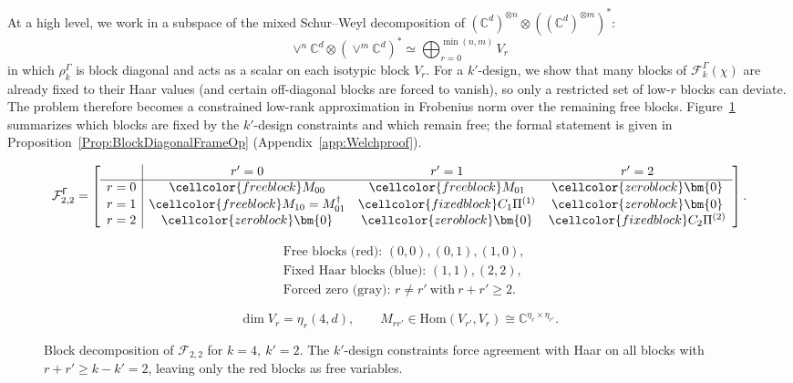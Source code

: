 \documentclass[aps,twocolumn,pra,superscriptaddress,nofootinbib]{revtex4-2}
\begin{document}
At a high level, we work in a subspace of the mixed Schur--Weyl decomposition of $(\mathbb{C}^d)^{\otimes n} \otimes ((\mathbb{C}^d)^{\otimes m})^*$:
\begin{equation}
    \vee^n \mathbb{C}^d \otimes (\vee^m \mathbb{C}^d)^* 
    \simeq \bigoplus_{r=0}^{\min(n,m)} V_r
\end{equation}
in which $\rho_k^{\mathsf{\Gamma}}$ is block diagonal and acts as a scalar on each isotypic block $V_r$.
For a $k'$-design, we show that many blocks of $\mathcal F_k^{\mathsf{\Gamma}}(\chi)$ are already fixed to their Haar values (and certain off-diagonal blocks are forced to vanish), so only a restricted set of low-$r$ blocks can deviate.
The problem therefore becomes a constrained low-rank approximation in Frobenius norm over the remaining free blocks. Figure~\ref{fig:block-k4-kp2} summarizes which blocks are fixed by the $k'$-design constraints and which remain free; the formal statement is given in Proposition~\ref{Prop:BlockDiagonalFrameOp} (Appendix~\ref{app:Welchproof}).
\begin{figure}[h!]
\centering
\renewcommand{\arraystretch}{1.35}



\[
\mathcal F_{2,2}^\mathsf{\Gamma}
=
\left[
\begin{array}{c|ccc}
 & r'=0 & r'=1 & r'=2\\
\hline
r=0 &
\cellcolor{freeblock} M_{00} &
\cellcolor{freeblock} M_{01} &
\cellcolor{zeroblock} \bm{0}
\\
r=1 &
\cellcolor{freeblock} M_{10}=M_{01}^{\dagger} &
\cellcolor{fixedblock} C_{1}\Pi^{(1)} &
\cellcolor{zeroblock} \bm{0}
\\
r=2 &
\cellcolor{zeroblock} \bm{0} &
\cellcolor{zeroblock} \bm{0} &
\cellcolor{fixedblock} C_{2}\Pi^{(2)}
\end{array}
\right].
\]

\vspace{1mm}
\[
\begin{aligned}
&\text{Free blocks (red): }(0,0),(0,1),(1,0),\\
&\text{Fixed Haar blocks (blue): }(1,1),(2,2),\\
&\text{Forced zero (gray): }r\neq r'\ \text{with}\ r+r'\ge 2.
\end{aligned}
\]

\vspace{1mm}
\[
\dim V_r=\eta_r(4,d),\qquad
M_{rr'}\in\mathrm{Hom}(V_{r'},V_r)\cong \mathbb C^{\eta_r\times\eta_{r'}}.
\]

\caption{Block decomposition of \(\mathcal F_{2,2}\) for \(k=4,\ k'=2\). 
The \(k'\)-design constraints force agreement with Haar on all blocks with \(r+r'\ge k-k'=2\), leaving only the red blocks as free variables.}
\label{fig:block-k4-kp2}
\end{figure}
\end{document}
